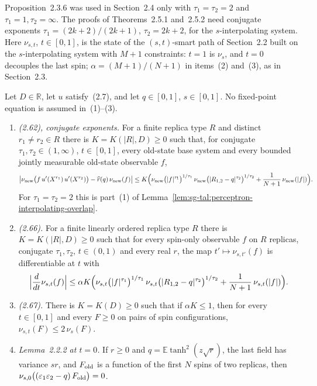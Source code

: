 Proposition~2.3.6 was used in Section~2.4 only with $\tau_1=\tau_2=2$ and $\tau_1=1,\tau_2=\infty$. The proofs
of Theorems~2.5.1 and~2.5.2 need conjugate exponents $\tau_1=(2k+2)/(2k+1)$, $\tau_2=2k+2$, for the
$s$-interpolating system. Here $\nu_{s,t}$, $t\in[0,1]$, is the state of the $(s,t)$-smart path of
Section~2.2 built on the $s$-interpolating system with $M+1$ constraints: $t=1$ is $\nu_s$, and $t=0$
decouples the last spin; $\alpha=(M+1)/(N+1)$ in items~(2) and~(3), as in Section~2.3.

\begin{proposition}\label{prop:sg-tal:perceptron-interpolating-holder}
  \leanok
Let $D\in\mathbb R$, let $u$ satisfy~(2.7), and let $q\in[0,1]$, $s\in[0,1]$. No fixed-point equation is
assumed in~(1)--(3).
\begin{enumerate}
\item \emph{(2.62), conjugate exponents.} For a finite replica type $R$ and distinct $r_1\ne r_2\in R$ there
is $K=K(|R|,D)\ge 0$ such that, for conjugate $\tau_1,\tau_2\in(1,\infty)$, $t\in[0,1]$, every old-state
base system and every bounded jointly measurable old-state observable $f$,
\[
 \bigl|\nu_{\rm new}\bigl(f\,u'(X^{r_1})\,u'(X^{r_2})\bigr)-\widehat r(q)\,\nu_{\rm new}(f)\bigr|
 \le K\Bigl(\nu_{\rm new}\bigl(|f|^{\tau_1}\bigr)^{1/\tau_1}\,\nu_{\rm new}\bigl(|R_{1,2}-q|^{\tau_2}\bigr)^{1/\tau_2}
 +\frac{1}{N+1}\,\nu_{\rm new}(|f|)\Bigr).
\]
For $\tau_1=\tau_2=2$ this is part~(1) of Lemma~\ref{lem:sg-tal:perceptron-interpolating-overlap}.
\item \emph{(2.66).} For a finite linearly ordered replica type $R$ there is $K=K(|R|,D)\ge 0$ such that for
every spin-only observable $f$ on $R$ replicas, conjugate $\tau_1,\tau_2$, $t\in(0,1)$ and every real $r$,
the map $t'\mapsto\nu_{s,t'}(f)$ is differentiable at $t$ with
\[
 \Bigl|\frac{d}{dt}\nu_{s,t}(f)\Bigr|\le\alpha K\Bigl(\nu_{s,t}\bigl(|f|^{\tau_1}\bigr)^{1/\tau_1}\,
 \nu_{s,t}\bigl(|R_{1,2}-q|^{\tau_2}\bigr)^{1/\tau_2}+\frac{1}{N+1}\,\nu_{s,t}(|f|)\Bigr).
\]
\item \emph{(2.67).} There is $K=K(D)\ge0$ such that if $\alpha K\le 1$, then for every $t\in[0,1]$ and every
$F\ge 0$ on pairs of spin configurations, $\nu_{s,t}(F)\le 2\,\nu_s(F)$.
\item \emph{Lemma~2.2.2 at $t=0$.} If $r\ge 0$ and $q=\mathbb E\tanh^2(z\sqrt r)$, the last field has variance
$sr$, and $F_{\rm old}$ is a function of the first $N$ spins of two replicas, then
$\nu_{s,0}\bigl((\varepsilon_1\varepsilon_2-q)\,F_{\rm old}\bigr)=0$.
\end{enumerate}
\end{proposition}
